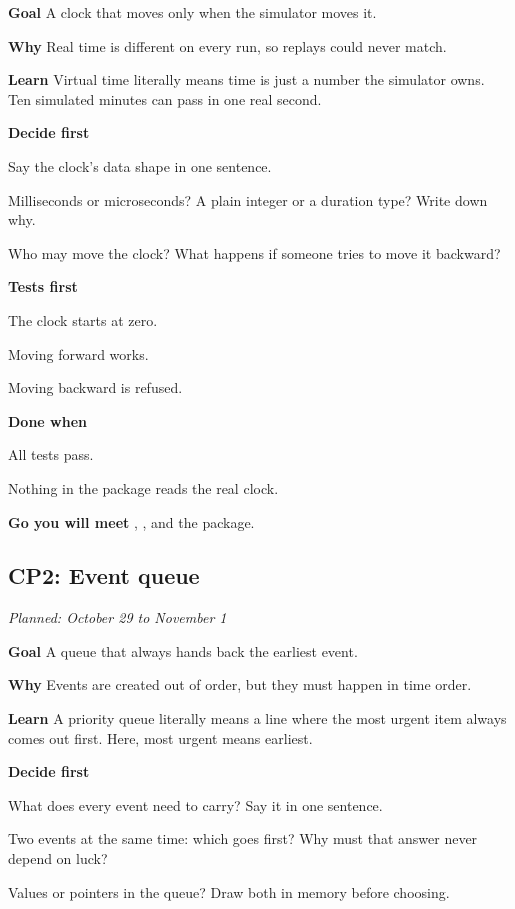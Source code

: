 \documentclass[11pt,letterpaper]{article}
\newcommand{\code}[1]{\texttt{\detokenize{#1}}}
\newcommand{\lbl}[1]{\textbf{#1}\enspace}
\newcommand{\when}[1]{\par\textit{Planned: #1}\par}
\begin{document}
\lbl{Goal} A clock that moves only when the simulator moves it.

\lbl{Why} Real time is different on every run, so replays could never match.

\lbl{Learn} Virtual time literally means time is just a number the simulator owns. Ten simulated minutes can pass in one real second.

\lbl{Decide first}
\begin{asks}
  \item Say the clock's data shape in one sentence.
  \item Milliseconds or microseconds? A plain integer or a duration type? Write down why.
  \item Who may move the clock? What happens if someone tries to move it backward?
\end{asks}

\lbl{Tests first}
\begin{checks}
  \item The clock starts at zero.
  \item Moving forward works.
  \item Moving backward is refused.
\end{checks}

\lbl{Done when}
\begin{checks}
  \item All tests pass.
  \item Nothing in the package reads the real clock.
\end{checks}

\lbl{Go you will meet} \code{time.Duration}, \code{int64}, and the \code{errors} package.

\subsection{CP2: Event queue}
\when{October 29 to November 1}

\lbl{Goal} A queue that always hands back the earliest event.

\lbl{Why} Events are created out of order, but they must happen in time order.

\lbl{Learn} A priority queue literally means a line where the most urgent item always comes out first. Here, most urgent means earliest.

\lbl{Decide first}
\begin{asks}
  \item What does every event need to carry? Say it in one sentence.
  \item Two events at the same time: which goes first? Why must that answer never depend on luck?
  \item Values or pointers in the queue? Draw both in memory before choosing.
\end{asks}
\end{document}
